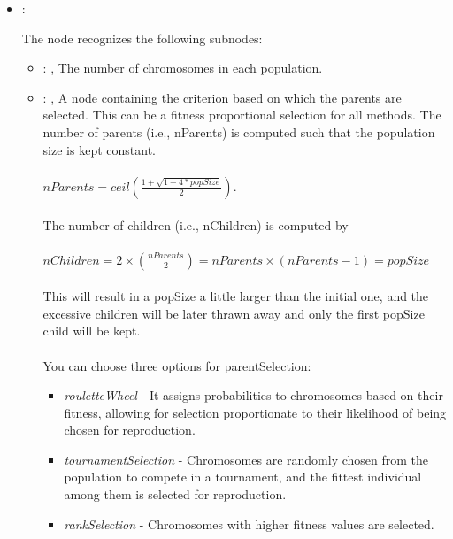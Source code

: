 \begin{itemize}
    \item {}:


      The  node recognizes the following subnodes:
      \begin{itemize}
        \item {}: ,
          The number of chromosomes in each population.

        \item {}: ,
          A node containing the criterion based on which the parents are selected. This can be a
          fitness proportional selection for all methods.                   The number of parents
          (i.e., nParents) is computed such that the population size is kept constant. \\\\
          $nParents = ceil(\frac{1 + \sqrt{1+4*popSize}}{2})$. \\\\                   The number of
          children (i.e., nChildren) is computed by \\\\                   $nChildren = 2 \times
          {nParents \choose 2} = nParents \times (nParents-1) = popSize$ \\\\                   This
          will result in a popSize a little larger than the initial one, and the excessive children
          will be later thrawn away and only the first popSize child will be kept. \\\\
          You can choose three options for parentSelection:                       \begin{itemize}
          \item \textit{rouletteWheel} - It assigns probabilities to chromosomes based on their
          fitness,                           allowing for selection proportionate to their
          likelihood of being chosen for reproduction.                           \item
          \textit{tournamentSelection} - Chromosomes are randomly chosen from the population to
          compete in a tournament,                           and the fittest individual among them
          is selected for reproduction.                           \item \textit{rankSelection} -
          Chromosomes with higher fitness values are selected.                       \end{itemize}


\end{itemize}
\end{itemize}
